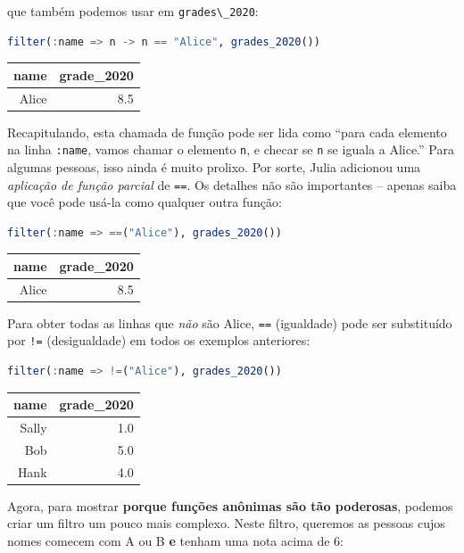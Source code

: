 \documentclass[
  notoc %
]{tufte-book}
\newcommand{\passthrough}[1]{#1}
\begin{document}
que também podemos usar em \passthrough{\lstinline!grades\_2020!}:

\begin{lstlisting}[language=Julia]
filter(:name => n -> n == "Alice", grades_2020())
\end{lstlisting}

\begin{longtable}[]{@{}rr@{}}
\toprule
name & grade\_2020 \\
\midrule
\endhead
Alice & 8.5 \\
\bottomrule
\end{longtable}

Recapitulando, esta chamada de função pode ser lida como ``para cada
elemento na linha \passthrough{\lstinline!:name!}, vamos chamar o
elemento \passthrough{\lstinline!n!}, e checar se
\passthrough{\lstinline!n!} se iguala a Alice.'' Para algumas pessoas,
isso ainda é muito prolixo. Por sorte, Julia adicionou uma
\emph{aplicação de função parcial} de \passthrough{\lstinline!==!}. Os
detalhes não são importantes -- apenas saiba que você pode usá-la como
qualquer outra função:

\begin{lstlisting}[language=Julia]
filter(:name => ==("Alice"), grades_2020())
\end{lstlisting}

\begin{longtable}[]{@{}rr@{}}
\toprule
name & grade\_2020 \\
\midrule
\endhead
Alice & 8.5 \\
\bottomrule
\end{longtable}

Para obter todas as linhas que \emph{não} são Alice,
\passthrough{\lstinline!==!} (igualdade) pode ser substituído por
\passthrough{\lstinline"!="} (desigualdade) em todos os exemplos
anteriores:

\begin{lstlisting}[language=Julia]
filter(:name => !=("Alice"), grades_2020())
\end{lstlisting}

\begin{longtable}[]{@{}rr@{}}
\toprule
name & grade\_2020 \\
\midrule
\endhead
Sally & 1.0 \\
Bob & 5.0 \\
Hank & 4.0 \\
\bottomrule
\end{longtable}

Agora, para mostrar \textbf{porque funções anônimas são tão poderosas},
podemos criar um filtro um pouco mais complexo. Neste filtro, queremos
as pessoas cujos nomes comecem com A ou B \textbf{e} tenham uma nota
acima de 6:
\end{document}
